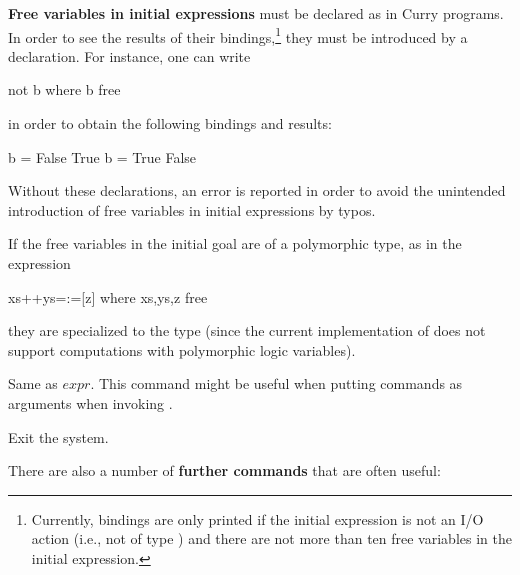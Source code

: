 \begin{description}
\textbf{Free variables in initial expressions} must be declared as
in Curry programs.
In order to see the results of their bindings,\footnote{Currently,
bindings are only printed if the initial expression is not an I/O action
(i.e., not of type )
and there are not more than ten free variables
in the initial expression.}
they must be introduced by a  declaration.
For instance, one can write
\begin{curry}
not b where b free
\end{curry}
in order to obtain the following bindings and results:
\begin{curry}
{b = False} True
{b = True} False
\end{curry}
Without these declarations, an error is reported in order to
avoid the unintended introduction of free variables in initial expressions
by typos.

If the free variables in the initial goal are of a polymorphic type,
as in the expression
\begin{curry}
xs++ys=:=[z] where xs,ys,z free
\end{curry}
they are specialized to the type \ccode{()}
(since the current implementation of \CYS does not support
computations with polymorphic logic variables).

\item[\fbox{:eval $expr$}]
Same as $expr$. This command might be useful when putting
commands as arguments when invoking .


\item[\fbox{\code{:quit}}] Exit the system.
\end{description}
%
\bigskip
%
There are also a number of {\bf further commands} that are often
useful:
%
